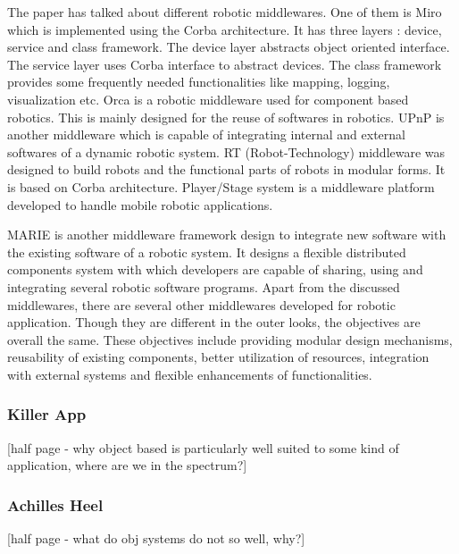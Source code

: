 \documentclass{acm_proc_article-sp}
\begin{document}
The paper has talked about different robotic middlewares. One of them is Miro which is implemented using the Corba architecture. It has three layers : device, service and class framework. The device layer abstracts object oriented interface. The service layer uses Corba interface to abstract devices. The class framework provides some frequently needed functionalities like mapping, logging, visualization etc. 
Orca is a robotic middleware used for component based robotics. This is mainly designed for the reuse of softwares in robotics.
UPnP is another middleware which is capable of integrating internal and external softwares of a dynamic robotic system.
RT (Robot-Technology) middleware was designed to build robots and the functional parts of robots in modular forms. It is based on Corba architecture.
Player/Stage system is a middleware platform developed to handle mobile robotic applications.

MARIE is another middleware framework design to integrate new software with the existing software of a robotic system. It designs a flexible distributed components system with which developers are capable of sharing, using and integrating several robotic software programs.
Apart from the discussed middlewares, there are several other middlewares developed for robotic application. Though they are different in the outer looks, the objectives are overall the same. These objectives include providing modular design mechanisms, reusability of existing components, better utilization of resources, integration with external systems and flexible enhancements of functionalities.











\subsubsection{Killer App}

[half page - why object based is particularly well suited to some kind of application, where are we in the spectrum?]


\subsubsection{Achilles Heel}

[half page - what do obj systems do not so well, why?]
\end{document}
